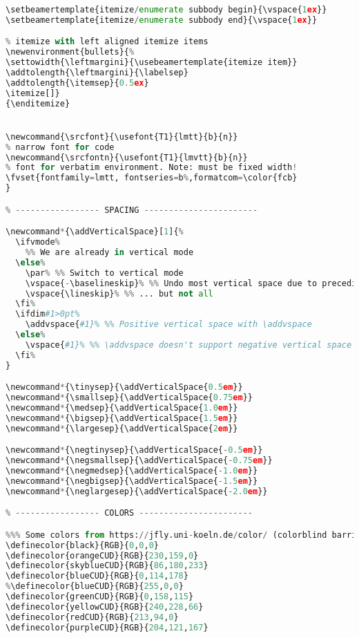 {\begin{lstlisting}[language=Python,style=normal,escapechar=?,morekeywords={True, False}, mathescape]
% ----- additional vertical spaces in itemize -----
\setbeamertemplate{itemize/enumerate subbody begin}{\vspace{1ex}}
\setbeamertemplate{itemize/enumerate subbody end}{\vspace{1ex}}

% itemize with left aligned itemize items
\newenvironment{bullets}{%
\settowidth{\leftmargini}{\usebeamertemplate{itemize item}}
\addtolength{\leftmargini}{\labelsep}
\addtolength{\itemsep}{0.5ex}
\itemize[]}
{\enditemize}


\newcommand{\srcfont}{\usefont{T1}{lmtt}{b}{n}}
% narrow font for code
\newcommand{\srcfontn}{\usefont{T1}{lmvtt}{b}{n}}
% font for verbatim environment. Note: must be fixed width!
\fvset{fontfamily=lmtt, fontseries=b%,formatcom=\color{fcb}
}

% ----------------- SPACING -----------------------

\newcommand*{\addVerticalSpace}[1]{%
  \ifvmode%
    %% We are already in vertical mode
  \else%
    \par% %% Switch to vertical mode
    \vspace{-\baselineskip}% %% Undo most vertical space due to preceding \par ...
    \vspace{\lineskip}% %% ... but not all
  \fi%
  \ifdim#1>0pt%
    \addvspace{#1}% %% Positive vertical space with \addvspace
  \else%
    \vspace{#1}% %% \addvspace doesn't support negative vertical space
  \fi%
}

\newcommand*{\tinysep}{\addVerticalSpace{0.5em}}
\newcommand*{\smallsep}{\addVerticalSpace{0.75em}}
\newcommand*{\medsep}{\addVerticalSpace{1.0em}}
\newcommand*{\bigsep}{\addVerticalSpace{1.5em}}
\newcommand*{\largesep}{\addVerticalSpace{2em}}

\newcommand*{\negtinysep}{\addVerticalSpace{-0.5em}}
\newcommand*{\negsmallsep}{\addVerticalSpace{-0.75em}}
\newcommand*{\negmedsep}{\addVerticalSpace{-1.0em}}
\newcommand*{\negbigsep}{\addVerticalSpace{-1.5em}}
\newcommand*{\neglargesep}{\addVerticalSpace{-2.0em}}

% ----------------- COLORS -----------------------

%%% Some colors from https://jfly.uni-koeln.de/color/ (colorblind barrier-free color pallet)
\definecolor{black}{RGB}{0,0,0}
\definecolor{orangeCUD}{RGB}{230,159,0}
\definecolor{skyblueCUD}{RGB}{86,180,233}
\definecolor{blueCUD}{RGB}{0,114,178}
%\definecolor{blueCUD}{RGB}{255,0,0}
\definecolor{greenCUD}{RGB}{0,158,115}
\definecolor{yellowCUD}{RGB}{240,228,66}
\definecolor{redCUD}{RGB}{213,94,0}
\definecolor{purpleCUD}{RGB}{204,121,167}



\end{lstlisting}}
